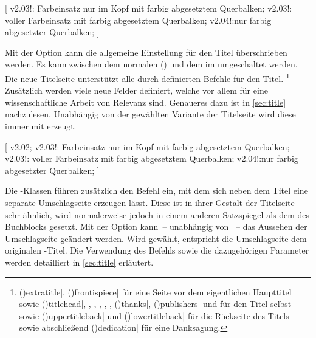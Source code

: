 \begin{DeclareEntity*}{}
\begin{DeclareEntity*}{}
\begin{DeclareEntity*}{}
\begin{Declaration}
  {}
[%
  v2.03!:%
    Farbeinsatz nur im Kopf mit farbig abgesetztem Querbalken;
  v2.03!:%
    voller Farbeinsatz mit farbig abgesetztem Querbalken;
  v2.04!:nur farbig abgesetzter Querbalken;%
]
\printdeclarationlist[Titel|?]

Mit der Option  kann die allgemeine Einstellung für den Titel 
überschrieben werden. Es kann zwischen dem normalen () 
und dem im \CD umgeschaltet werden. Die neue Titelseite unterstützt alle durch 
\KOMAScript definierten Befehle für den Titel.%
\footnote{%
  \Macro(){extratitle|},
  \Macro(){frontispiece|} für eine 
  Seite vor dem eigentlichen Haupttitel sowie
  \Macro(){titlehead|},
  , ,
  , ,
  , \Macro(){thanks|}, 
  \Macro(){publishers|} und 
   für den Titel selbst sowie 
  \Macro(){uppertitleback|}
  und
  \Macro(){lowertitleback|} 
  für die Rückseite des Titels sowie abschließend 
  \Macro(){dedication|} für eine 
  Danksagung.
}
Zusätzlich werden viele neue Felder definiert, welche vor allem für eine 
wissenschaftliche Arbeit von Relevanz sind. Genaueres dazu 
ist in \autoref{sec:title} nachzulesen. Unabhängig von der gewählten Variante 
der Titelseite wird diese immer mit  erzeugt.
\end{Declaration}

\begin{Declaration}
  {}
[%
  v2.02;%
  v2.03!:%
    Farbeinsatz nur im Kopf mit farbig abgesetztem Querbalken;
  v2.03!:%
    voller Farbeinsatz mit farbig abgesetztem Querbalken;
  v2.04!:nur farbig abgesetzter Querbalken;%
]
\printdeclarationlist[Umschlagseite|?]

Die \TUDScript-Klassen führen zusätzlich den Befehl  ein, mit 
dem sich neben dem Titel eine separate Umschlagseite erzeugen lässt. Diese ist 
in ihrer Gestalt der Titelseite sehr ähnlich, wird normalerweise jedoch in 
einem anderen Satzspiegel als dem des Buchblocks gesetzt. Mit der Option 
 kann~-- unabhängig von ~-- das Aussehen der 
Umschlagseite geändert werden. Wird  gewählt, entspricht 
die Umschlagseite dem originalen \KOMAScript-Titel. Die Verwendung des Befehls 
 sowie die dazugehörigen Parameter werden detailliert in 
\autoref{sec:title} erläutert.
\end{Declaration}


\end{DeclareEntity*}
\end{DeclareEntity*}
\end{DeclareEntity*}
